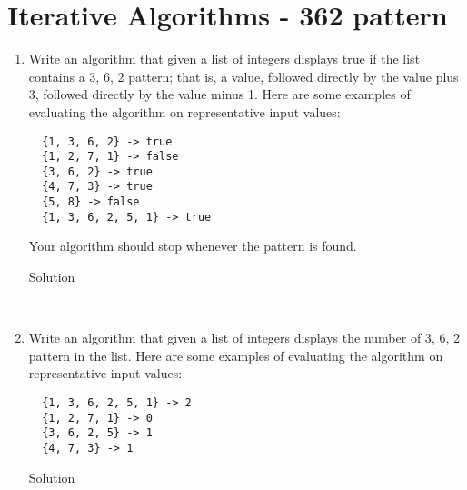 \documentclass[11pt,a4paper]{article}
\begin{document}
\section{Iterative Algorithms - 362 pattern}
\begin{enumerate}[label=(\alph*)]
  \item Write an algorithm that given a list of integers displays true if the list contains a 3, 6, 2 pattern; that is,
  a value, followed directly by the value plus 3, followed directly by the value minus 1.
  Here are some examples of evaluating the algorithm on representative input values:
  \begin{verbatim}
  {1, 3, 6, 2} -> true
  {1, 2, 7, 1} -> false
  {3, 6, 2} -> true
  {4, 7, 3} -> true
  {5, 8} -> false
  {1, 3, 6, 2, 5, 1} -> true
  \end{verbatim}
  Your algorithm should stop whenever the pattern is found.
  \begin{description}
    \item[Solution] \hfill \\
    
  \end{description}
  \vfill
  \item Write an algorithm that given a list of integers displays the number of 3, 6, 2 pattern in the list. Here are some examples of evaluating the algorithm on representative input values:
  \begin{verbatim}
  {1, 3, 6, 2, 5, 1} -> 2
  {1, 2, 7, 1} -> 0
  {3, 6, 2, 5} -> 1
  {4, 7, 3} -> 1
  \end{verbatim}
  \begin{description}
    \item[Solution] \hfill \\
    
  \end{description}
  \vfill
\end{enumerate}
\vfill
\end{document}
